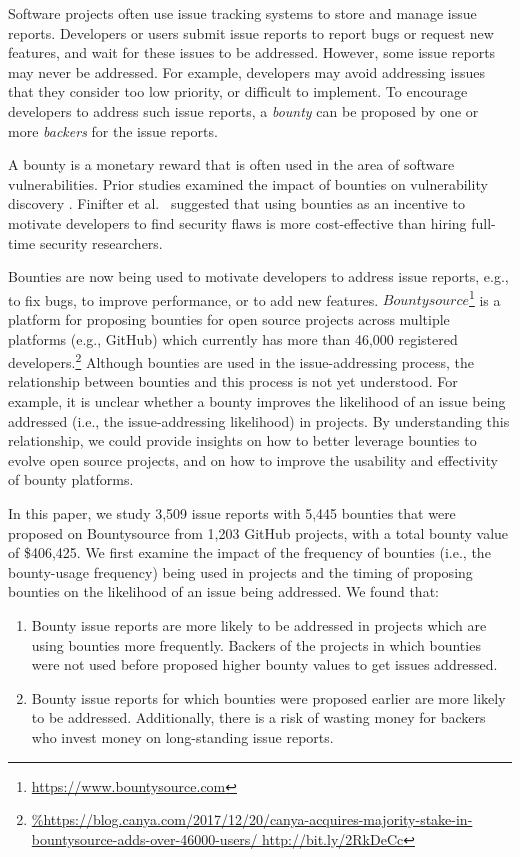 
Software projects often use issue tracking systems to store and manage issue reports. Developers or users submit issue reports to report bugs or request new features, and wait for these issues to be addressed. However, some issue reports may never be addressed.
For example, developers may avoid addressing issues that they consider too low priority, or difficult to implement. To encourage developers to address such issue reports, a \textit{bounty} can be proposed by one or more \textit{backers} for the issue reports.

A bounty is a monetary reward that is often used in the area of software vulnerabilities. Prior studies examined the impact of bounties on vulnerability discovery \cite{zhao2017devising, hata2017understanding,finifter2013empirical}. Finifter et al.~\cite{finifter2013empirical} suggested that using bounties as an incentive to motivate developers to find security flaws is more cost-effective than hiring full-time security researchers.

Bounties are now being used to motivate developers to address issue reports, e.g., to fix bugs, to improve performance, or to add new features.
$Bountysource$\footnote{\url{https://www.bountysource.com}} is a platform for proposing bounties for open source projects across multiple platforms (e.g., GitHub) which currently has more than 46,000 registered developers.\footnote{\url{%
http://bit.ly/2RkDeCc}} Although bounties are used in the issue-addressing process, the relationship between bounties and this process is not yet understood. For example, it is unclear whether a bounty improves the likelihood of an issue being addressed (i.e., the issue-addressing likelihood) in projects. By understanding this relationship, we could provide insights on how to better leverage bounties to evolve open source projects, and on how to improve the usability and effectivity of bounty platforms.


In this paper, we study 3,509 issue reports with 5,445 bounties that were proposed on Bountysource from 1,203 GitHub projects, with a total bounty value of \$406,425. We first examine the impact of the frequency of bounties (i.e., the bounty-usage frequency) being used in projects and the timing of proposing bounties on the likelihood of an issue being addressed. We found that:
\begin{enumerate}
    \item Bounty issue reports are more likely to be addressed in projects which are using bounties more frequently. Backers of the projects in which bounties were not used before proposed higher bounty values to get issues addressed.
    \item Bounty issue reports for which bounties were proposed earlier are more likely to be addressed. Additionally, there is a risk of wasting money for backers who invest money on long-standing issue reports.
\end{enumerate}

